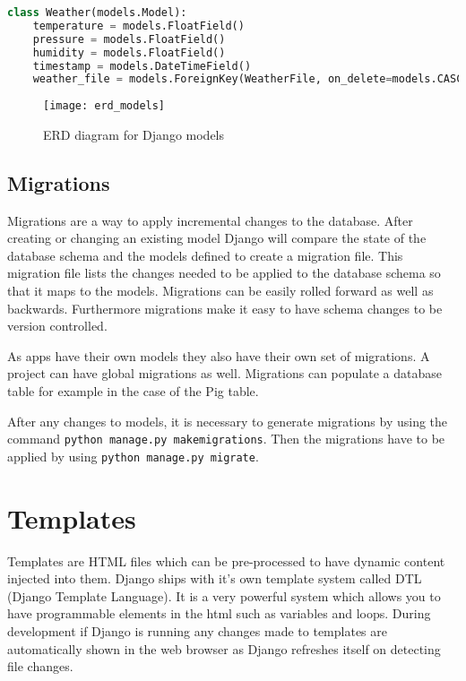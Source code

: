 \begin{lstlisting}[language={Python}]
class Weather(models.Model):
    temperature = models.FloatField()
    pressure = models.FloatField()
    humidity = models.FloatField()
    timestamp = models.DateTimeField()
    weather_file = models.ForeignKey(WeatherFile, on_delete=models.CASCADE)
\end{lstlisting}

\begin{figure}[H]
	\centering
	\texttt{[image: erd\_models]}
	\caption{ERD diagram for Django models}
	\label{fig:erd_models}
\end{figure}

\subsection{Migrations}
Migrations are a way to apply incremental changes to the database. After creating or changing an existing model Django
will compare the state of the database schema and the models defined to create a migration file. This migration file
lists the changes needed to be applied to the database schema so that it maps to the models. Migrations can be easily rolled forward
as well as backwards. Furthermore migrations make it easy to have schema changes to be version controlled.

As apps have their own models they also have their own set of migrations. A project can have global migrations as well. Migrations
can populate a database table for example in the case of the Pig table.

After any changes to models, it is necessary to generate migrations by using the command \texttt{python manage.py makemigrations}. Then
the migrations have to be applied by using \texttt{python manage.py migrate}.

\section{Templates}
\label{sec:templates}
Templates are HTML files which can be pre-processed to have dynamic content injected into them. Django ships with it's own
template system called DTL (Django Template Language). It is a very powerful system which allows you to have programmable elements
in the html such as variables and loops. During development if Django is running any changes made to templates are 
automatically shown in the web browser as Django refreshes itself on detecting file changes.

